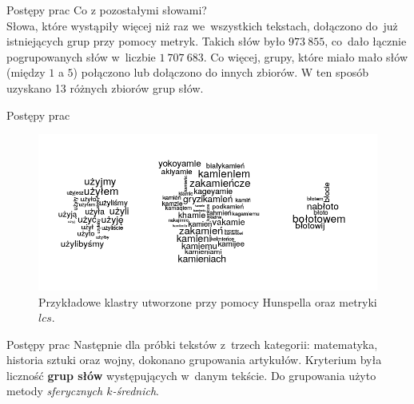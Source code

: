 \documentclass[11pt,pdftex,mathserif]{beamer}\usepackage[]{graphicx}\usepackage[]{color}
\theoremstyle{definition}
\begin{document}
\begin{frame}{Postępy prac}
Co z pozostałymi słowami?\\
Słowa, które wystąpiły więcej niż raz we~wszystkich tekstach, dołączono do~już istniejących grup przy pomocy metryk. Takich słów było $973\ 855$, co~dało łącznie pogrupowanych słów w~liczbie $1\ 707\ 683$. Co więcej, grupy, które miało mało słów (między $1$ a $5$) połączono lub dołączono do innych zbiorów. W ten sposób uzyskano 13 różnych zbiorów grup słów.
\end{frame}


\begin{frame}{Postępy prac}
\begin{figure}[h]
      \centering
      \includegraphics[width=12cm] {clust_all2}
      \caption{Przykładowe klastry utworzone przy pomocy Hunspella oraz metryki $lcs$.}
    \end{figure}
\end{frame}


\begin{frame}{Postępy prac}
Następnie dla próbki tekstów z~trzech kategorii: matematyka, historia sztuki oraz wojny, dokonano grupowania artykułów. Kryterium była liczność \textbf{grup słów} występujących w~danym tekście. Do grupowania użyto metody \emph{sferycznych $k$-średnich}.
\end{frame}

\end{document}
